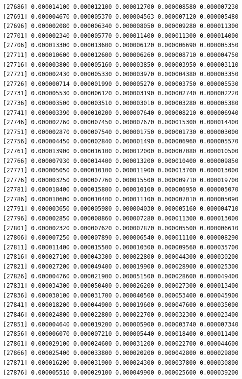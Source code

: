 \documentclass[]{article}
\begin{document}
\begin{verbatim}
[27686] 0.000014100 0.000012100 0.000012700 0.000008580 0.000007230
[27691] 0.000004670 0.000005370 0.000004563 0.000007120 0.000005480
[27696] 0.000002080 0.000006340 0.000008050 0.000009280 0.000011300
[27701] 0.000002340 0.000005770 0.000011400 0.000011300 0.000014000
[27706] 0.000013300 0.000013600 0.000006120 0.000006690 0.000005350
[27711] 0.000010600 0.000012600 0.000006260 0.000008710 0.000004750
[27716] 0.000003800 0.000005160 0.000003850 0.000003950 0.000003110
[27721] 0.000002430 0.000005330 0.000003970 0.000004380 0.000003350
[27726] 0.000000714 0.000001990 0.000005270 0.000003750 0.000005530
[27731] 0.000005530 0.000006120 0.000003190 0.000002740 0.000002220
[27736] 0.000003500 0.000003510 0.000003010 0.000003280 0.000005380
[27741] 0.000003390 0.000010200 0.000007640 0.000008210 0.000006940
[27746] 0.000002760 0.000007450 0.000007670 0.000015300 0.000014400
[27751] 0.000002870 0.000007540 0.000001750 0.000001730 0.000003000
[27756] 0.000004450 0.000002840 0.000001490 0.000006960 0.000005570
[27761] 0.000013900 0.000016100 0.000012000 0.000007080 0.000010500
[27766] 0.000007930 0.000014400 0.000013200 0.000010400 0.000009850
[27771] 0.000005050 0.000010100 0.000011900 0.000013700 0.000013000
[27776] 0.000003250 0.000007760 0.000015500 0.000009710 0.000019700
[27781] 0.000018400 0.000015800 0.000010100 0.000006950 0.000005070
[27786] 0.000010600 0.000010400 0.000011100 0.000007010 0.000005090
[27791] 0.000003650 0.000005980 0.000004030 0.000005160 0.000004710
[27796] 0.000002850 0.000008860 0.000007280 0.000011300 0.000013000
[27801] 0.000002320 0.000007620 0.000007870 0.000005500 0.000006610
[27806] 0.000007250 0.000007890 0.000006540 0.000011100 0.000008290
[27811] 0.000011400 0.000015500 0.000010300 0.000009560 0.000035700
[27816] 0.000027100 0.000043300 0.000022800 0.000044300 0.000030200
[27821] 0.000027200 0.000049400 0.000019900 0.000028900 0.000025300
[27826] 0.000004760 0.000021900 0.000051500 0.000028600 0.000049400
[27831] 0.000034300 0.000050400 0.000026200 0.000027300 0.000013400
[27836] 0.000030100 0.000031700 0.000040500 0.000053400 0.000045900
[27841] 0.000018200 0.000044900 0.000019600 0.000047600 0.000035000
[27846] 0.000024800 0.000022800 0.000022700 0.000032300 0.000023400
[27851] 0.000004640 0.000019200 0.000005900 0.000003740 0.000007340
[27856] 0.000006070 0.000007210 0.000005440 0.000018400 0.000011400
[27861] 0.000029100 0.000024600 0.000031200 0.000022700 0.000044600
[27866] 0.000025400 0.000033800 0.000020200 0.000042800 0.000029800
[27871] 0.000016200 0.000031900 0.000024300 0.000037800 0.000030800
[27876] 0.000005510 0.000029100 0.000049900 0.000025600 0.000039200

\end{verbatim}
\end{document}
